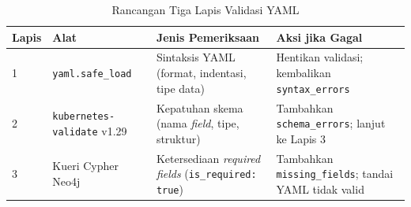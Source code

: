 \renewcommand{\arraystretch}{1.3}
\captionsetup[table]{justification=raggedright,singlelinecheck=false}
\begin{table}[H]
\caption{Rancangan Tiga Lapis Validasi YAML}
\label{tbl:yaml_validation_iv}
\centering
\begin{tabular}{|p{}|p{}|p{}|p{}|}
\hline
\textbf{Lapis} & \textbf{Alat} & \textbf{Jenis Pemeriksaan} & \textbf{Aksi jika Gagal} \\
\hline
1 & \texttt{yaml.safe\_load} & Sintaksis YAML (format, indentasi, tipe data) & Hentikan validasi; kembalikan \texttt{syntax\_errors} \\
\hline
2 & \texttt{kubernetes- validate} v1.29 & Kepatuhan skema (nama \textit{field}, tipe, struktur) & Tambahkan \texttt{schema\_errors}; lanjut ke Lapis 3 \\
\hline
3 & Kueri Cypher Neo4j & Ketersediaan \textit{required fields} (\texttt{is\_required: true}) & Tambahkan \texttt{missing\_fields}; tandai YAML tidak valid \\
\hline
\end{tabular}
\end{table}
